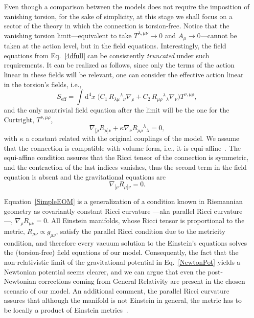 \documentclass[aps,prd,12pt,twocolumn,superscriptaddress,showpacs,showkeys,reprint%
]{revtex4-1}
\newcommand\nab[1]{\nabla_{{#1}}}
\renewcommand{\(}{\left(}
\renewcommand{\)}{\right)}
\renewcommand{\[}{\left[}
\renewcommand{\]}{\right]}
\newcommand{\dn}[2]{{\mathrm{d}}^{#1}{#2}\;}
\newcommand{\hl}[1]{{\color{red} \bfseries{#1}}}
\begin{document}
Even though a comparison between the models does not require the imposition of vanishing torsion, for the sake of simplicity, at this stage we shall focus on a sector of the theory in which the connection is torsion-free. Notice that the vanishing torsion limit---equivalent to take $T^{\lambda,\mu\nu} \to 0$ and $A_\mu \to 0$---cannot be taken at the action level, but in the field equations. Interestingly, the field equations from Eq.~\eqref{4dfull} can be consistently \emph{truncated} under such requirements. It can be realized as follows, since only the terms of the action linear in these fields will be relevant, one can consider the effective action linear in the torsion's fields, i.e.,
\begin{equation}
  S_{\text{eff}} = \int\dn{4}{x} \Big( C_1\, R_{\lambda\mu}{}^{\lambda}{}_\nu \nabla_\rho %
  + C_2 \, R_{\mu\rho}{}^{\lambda}{}_\lambda \nabla_\nu \Big) T^{\nu,\mu\rho} ,
\end{equation}
and the only nontrivial field equation after the limit will be the one for the Curtright, $T^{\nu,\mu\rho}$,
\begin{equation}
  \nab{[\rho} R_{\mu]\nu} + \kappa \nab{\nu} R_{\mu\rho}{}^\lambda{}_\lambda = 0,
\end{equation}
with $\kappa$ a constant related with the original couplings of the model. We assume that the connection is compatible with volume form, i.e., it is equi-affine~\cite{nomizu1994affine,MO-Bryant02}.  The equi-affine condition assures that the Ricci tensor of the connection is symmetric, and the contraction of the last indices vanishes, thus the second term in the field equation is absent and the gravitational equations are
\begin{equation}
  \nab{[\rho} R_{\mu]\nu} = 0.
  \label{SimpleEOM}
\end{equation}

Equation~\eqref{SimpleEOM} is a generalization of a condition known in Riemannian geometry as covariantly constant Ricci curvature ---aka parallel Ricci curvature---, \mbox{$\nab{\rho} R_{\mu\nu} = 0$.}  All Einstein manifolds, whose Ricci tensor is proportional to the metric, \mbox{$R_{\mu\nu} \propto g_{\mu\nu}$,} satisfy the parallel Ricci condition due to the metricity condition, and therefore every vacuum solution to the Einstein's equations solves the (torsion-free) field equations of our model. Consequently, the fact that the non-relativistic limit of the gravitational potential in Eq.~\eqref{NewtonPot} yields a Newtonian potential seems clearer, and we can argue that even the post-Newtonian corrections coming from General Relativity are present in the chosen scenario of our model. An additional comment, the parallel Ricci curvature assures that although the manifold is not Einstein in general, the metric has to be locally a product of Einstein metrics~\cite{Besse}.
\end{document}
